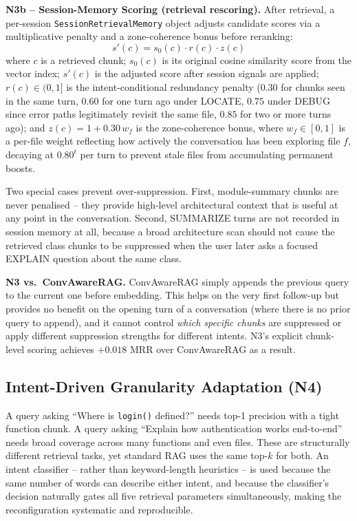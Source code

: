 \documentclass[conference]{IEEEtran}
\begin{document}
\textbf{N3b -- Session-Memory Scoring (retrieval rescoring).}
After retrieval, a per-session \texttt{SessionRetrievalMemory} object
adjusts candidate scores via a multiplicative penalty and a zone-coherence
bonus before reranking:
\begin{equation}
s'(c) = s_0(c)\cdot r(c)\cdot z(c)
\end{equation}
where $c$ is a retrieved chunk; $s_0(c)$ is its original cosine similarity
score from the vector index; $s'(c)$ is the adjusted score after session
signals are applied; $r(c) \in (0,1]$ is the intent-conditional redundancy
penalty ($0.30$ for chunks seen in the same turn, $0.60$ for one turn ago
under LOCATE, $0.75$ under DEBUG since error paths legitimately revisit
the same file, $0.85$ for two or more turns ago); and $z(c) = 1 + 0.30\,w_f$
is the zone-coherence bonus, where $w_f \in [0,1]$ is a per-file weight
reflecting how actively the conversation has been exploring file $f$,
decaying at $0.80^t$ per turn to prevent stale files from accumulating
permanent boosts.

Two special cases prevent over-suppression. First, module-summary chunks
are never penalised -- they provide high-level architectural context that
is useful at any point in the conversation. Second, SUMMARIZE turns are
not recorded in session memory at all, because a broad architecture scan
should not cause the retrieved class chunks to be suppressed when the user
later asks a focused EXPLAIN question about the same class.

\textbf{N3 vs.\ ConvAwareRAG.} ConvAwareRAG simply appends the previous
query to the current one before embedding. This helps on the very first
follow-up but provides no benefit on the opening turn of a conversation
(where there is no prior query to append), and it cannot control
\emph{which specific chunks} are suppressed or apply different suppression
strengths for different intents. N3's explicit chunk-level scoring
achieves $+0.018$ MRR over ConvAwareRAG as a result.

\subsection{Intent-Driven Granularity Adaptation (N4)}

A query asking ``Where is \texttt{login()} defined?''
needs top-1 precision with a tight function chunk. A query asking ``Explain
how authentication works end-to-end'' needs broad coverage across many
functions and even files. These are structurally different retrieval tasks,
yet standard RAG uses the same top-$k$ for both. An intent
classifier -- rather than keyword-length heuristics -- is used because the
same number of words can describe either intent, and because the classifier's
decision naturally gates all five retrieval parameters simultaneously,
making the reconfiguration systematic and reproducible.
\end{document}
